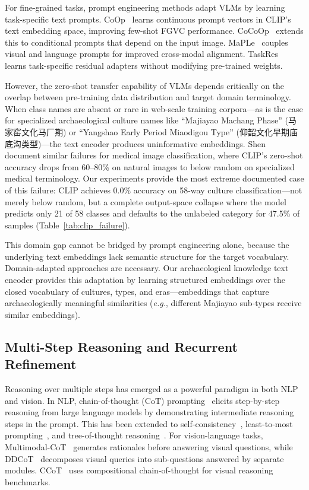 \documentclass[10pt,twocolumn,letterpaper]{article}
\begin{document}
For fine-grained tasks, prompt engineering methods adapt VLMs by learning task-specific text prompts. CoOp~\cite{zhou2022learning} learns continuous prompt vectors in CLIP's text embedding space, improving few-shot FGVC performance. CoCoOp~\cite{zhou2022conditional} extends this to conditional prompts that depend on the input image. MaPLe~\cite{khattak2023maple} couples visual and language prompts for improved cross-modal alignment. TaskRes~\cite{yu2023task} learns task-specific residual adapters without modifying pre-trained weights.

However, the zero-shot transfer capability of VLMs depends critically on the overlap between pre-training data distribution and target domain terminology. When class names are absent or rare in web-scale training corpora---as is the case for specialized archaeological culture names like ``Majiayao Machang Phase'' (马家窑文化马厂期) or ``Yangshao Early Period Miaodigou Type'' (仰韶文化早期庙底沟类型)---the text encoder produces uninformative embeddings. Shen~\etal~\cite{shen2022domain} document similar failures for medical image classification, where CLIP's zero-shot accuracy drops from 60--80\% on natural images to below random on specialized medical terminology. Our experiments provide the most extreme documented case of this failure: CLIP achieves 0.0\% accuracy on 58-way culture classification---not merely below random, but a complete output-space collapse where the model predicts only 21 of 58 classes and defaults to the unlabeled category for 47.5\% of samples (Table~\ref{tab:clip_failure}).

This domain gap cannot be bridged by prompt engineering alone, because the underlying text embeddings lack semantic structure for the target vocabulary. Domain-adapted approaches are necessary. Our archaeological knowledge text encoder provides this adaptation by learning structured embeddings over the closed vocabulary of cultures, types, and eras---embeddings that capture archaeologically meaningful similarities (\emph{e.g.}, different Majiayao sub-types receive similar embeddings).

\subsection{Multi-Step Reasoning and Recurrent Refinement}

Reasoning over multiple steps has emerged as a powerful paradigm in both NLP and vision. In NLP, chain-of-thought (CoT) prompting~\cite{wei2022chain} elicits step-by-step reasoning from large language models by demonstrating intermediate reasoning steps in the prompt. This has been extended to self-consistency~\cite{wang2022self}, least-to-most prompting~\cite{zhou2022least}, and tree-of-thought reasoning~\cite{yao2024tree}. For vision-language tasks, Multimodal-CoT~\cite{zhang2023multicot} generates rationales before answering visual questions, while DDCoT~\cite{zheng2023ddcot} decomposes visual queries into sub-questions answered by separate modules. CCoT~\cite{mitra2024compositional} uses compositional chain-of-thought for visual reasoning benchmarks.
\end{document}
